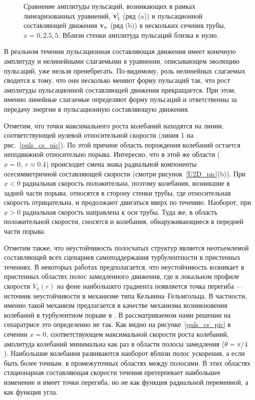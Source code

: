 \begin{figure}
\caption{Сравнение амплитуды пульсаций, возникающих в рамках линеаризованных уравнений, $\mathbf{v}'_1$ (ряд (a)) и пульсационной составляющей движения $\mathbf{v}_n$ (ряд (b)) в нескольких сечения трубы, $x = 0, 2.5, 5$. Вблизи стенки амплитуда пульсаций близка к нулю.}
\label{lin_amp_cmp_pic}
\end{figure}

В реальном течении пульсационная составляющая движения имеет конечную амплитуду и нелинейными слагаемыми в уравнении, описывающем эволюцию пульсаций, уже нельзя пренебрегать. По-видимому, роль нелинейных слагаемых сводится к тому, что они несколько меняют форму пульсаций так, что рост амплитуды пульсационной составляющей движения прекращается. При этом, именно линейные слагаемые определяют форму пульсаций и ответственны за передачу энергии в пульсационную составляющую движения. 

Отметим, что точки максимального роста колебаний находятся на линии, соответствующей нулевой относительной скорости (линия 1 на рис.~\ref{puls_cs_pic}). По этой причине область порождения колебаний остается неподвижной относительно порыва. Интересно, что в этой же области ($x = 0,\ r \approx 0.4$) происходит смена знака радиальной компоненты осесимметричной составляющей скорости (смотри рисунок~\ref{U2D_pic}(b)). При $x<0$ радиальная скорость положительна, поэтому колебания, возникшие в задней части порыва, относятся в сторону стенки трубы, где относительная скорость отрицательна, и продолжают двигаться вверх по течению. Наоборот, при $x>0$ радиальная скорость направлена к оси трубы. Туда же, в область положительной скорости, сносятся и колебания, обнаруживающиеся в передней части порыва.

Отметим также, что неустойчивость полосчатых структур является неотъемлемой составляющей всех сценариев самоподдержания турбулентности в пристенных течениях. В некоторых работах предполагается, что неустойчивость возникает в пристенных областях полос замедленного движения, где в локальном профиле скорости $V_x(r)$ на фоне наибольшего градиента появляется точка перегиба --- источник неустойчивости в механизме типа Кельвина--Гельмгольца. В частности, именно такой механизм предлагается в качестве механизма возникновения колебаний в турбулентном порыве в \cite{Shimizu2009}. В рассматриваемом нами решении на сепаратрисе это определенно не так. Как видно на рисунке~\ref{puls_cs_pic} в сечении $x=0$, соответствующем максимальной скорости роста колебаний, амплитуда колебаний минимальна как раз в области полосы замедления ($\theta=\pi/4$). Наибольшие колебания развиваются наоборот вблизи полос ускорения, а если быть более точным, в промежуточных областях между полосами. В этих областях стационарная составляющая скорости течения претерпевает наибольшее изменение и имеет точки перегиба, но не как функция радиальной переменной, а как функция угла.



